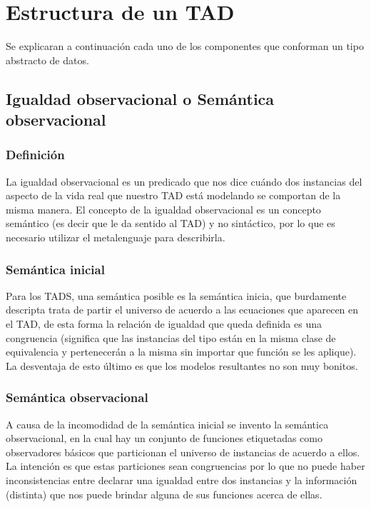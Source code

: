 \newpage
\section{Estructura de un TAD}
Se explicaran a continuaci\'on cada uno de los componentes que conforman un tipo abstracto de datos.


\subsection{Igualdad observacional o Sem\'antica observacional}
\subsubsection*{Definici\'on}
La igualdad observacional es un predicado que nos dice cu\'ando dos instancias del aspecto de la vida real que nuestro TAD est\'a modelando se comportan de la misma manera. El concepto de la igualdad observacional es un concepto sem\'antico (es decir que le da sentido al TAD) y no sint\'actico, por lo que es necesario utilizar el metalenguaje para describirla.

\subsubsection*{Sem\'antica inicial}
Para los TADS, una sem\'antica posible es la sem\'antica inicia, que burdamente descripta trata de partir el universo de acuerdo a las ecuaciones que aparecen en el TAD, de esta forma la relaci\'on de igualdad que queda definida es una congruencia (significa que las instancias del tipo est\'an en la misma clase de equivalencia y pertenecer\'an a la misma sin importar que funci\'on se les aplique). La desventaja de esto \'ultimo es que los modelos resultantes no son muy bonitos. 

\subsubsection*{Sem\'antica observacional}
A causa de la incomodidad de la sem\'antica inicial se invento la sem\'antica observacional, en la cual hay un conjunto de funciones etiquetadas como observadores b\'asicos que particionan el universo de instancias de acuerdo a ellos. La intenci\'on es que estas particiones sean congruencias por lo que no puede haber inconsistencias entre declarar una igualdad entre dos instancias y la informaci\'on (distinta) que nos puede brindar alguna de sus funciones acerca de ellas.

